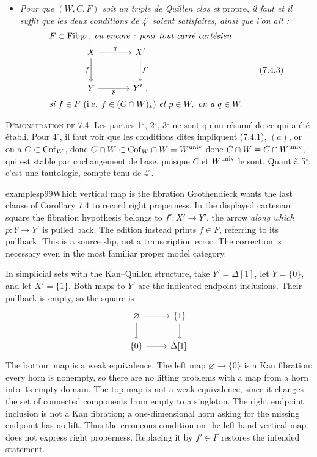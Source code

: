 \begin{itemize}[leftmargin=*]
\item[5$^\circ$)] 
\textit{Pour que $(W,C,F)$ soit un triple de Quillen clos et} propre, \textit{il faut et il suffit que les deux conditions de 4$^\circ$ soient satisfaites, ainsi que l'on ait :}
\[
\begin{aligned}
&F\subset \Fib_W,\ \textit{ou encore : pour tout carré cartésien}\\
&\qquad\qquad\begin{tikzcd}[ampersand replacement=\&, row sep=large, column sep=large]
X \arrow[r, "q"] \arrow[d, "f"'] \& X' \arrow[d, "f'"] \\
Y \arrow[r, "p"'] \& Y'\ ,
\end{tikzcd}\\
&\textit{si } f\in F \ (\text{i.e. } f\in (C\cap W)_*)\ \textit{et } p\in W,\ \textit{on a } q\in W.
\end{aligned}
\tag*{(7.4.3)}
\]
\end{itemize}

\textsc{Démonstration de} 7.4. Les parties 1$^\circ$, 2$^\circ$, 3$^\circ$ ne sont qu'un résumé de ce qui a été établi. Pour 4$^\circ$, il faut voir que les conditions dites impliquent (7.4.1), $(a)$, or on a $C\subset \mathrm{Cof}_W$, donc $C\cap W\subset \mathrm{Cof}_W\cap W = W^{\mathrm{univ}}$
donc $C\cap W = C\cap W^{\mathrm{univ}}$, qui est stable par cochangement de base, puisque $C$ et $W^{\mathrm{univ}}$ le sont. Quant à 5$^\circ$, c'est une tautologie, compte tenu de 4$^\circ$.

\begin{dcomment}{examples}{p99}{Which vertical map is the fibration}
Grothendieck wants the last clause of Corollary 7.4 to record right properness. In the displayed cartesian square the fibration hypothesis belongs to $f':X'\to Y'$, the arrow \emph{along which} $p:Y\to Y'$ is pulled back. The edition instead prints $f\in F$, referring to its pullback. This is a source slip, not a transcription error. The correction is necessary even in the most familiar proper model category.

In simplicial sets with the Kan--Quillen structure, take $Y'=\Delta[1]$, let $Y=\{0\}$, and let $X'=\{1\}$. Both maps to $Y'$ are the indicated endpoint inclusions. Their pullback is empty, so the square is
\[
\begin{tikzcd}
\varnothing\arrow[r]\arrow[d] & \{1\}\arrow[d]\\
\{0\}\arrow[r] & \Delta[1].
\end{tikzcd}
\]
The bottom map is a weak equivalence. The left map $\varnothing\to\{0\}$ is a Kan fibration: every horn is nonempty, so there are no lifting problems with a map from a horn into its empty domain. The top map is not a weak equivalence, since it changes the set of connected components from empty to a singleton. The right endpoint inclusion is not a Kan fibration; a one-dimensional horn asking for the missing endpoint has no lift. Thus the erroneous condition on the left-hand vertical map does not express right properness. Replacing it by $f'\in F$ restores the intended statement.
\end{dcomment}


